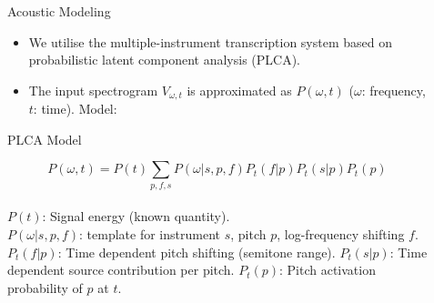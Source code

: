 \documentclass[final]{beamer}
\newlength{\sepwid}
\newlength{\onecolwid}
\newlength{\twocolwid}
\begin{document}
\begin{frame}[t]
\begin{columns}[t]
\begin{column}{\onecolwid}

\end{column} %

\begin{column}{\sepwid}\end{column} %

\begin{column}{\twocolwid} %

\begin{columns}[t,totalwidth=\twocolwid] %

\begin{column}{\onecolwid}\vspace{-.6in} %


\begin{block}{Acoustic Modeling}

\begin{itemize}
\item We utilise the multiple-instrument transcription system based on probabilistic latent component analysis (PLCA). 
\item The input spectrogram $V_{\omega,t}$ is approximated as $P(\omega,t)$ ($\omega$: frequency, $t$: time). Model:
\end{itemize}

\begin{alertblock}{PLCA Model}

\begin{equation}
P(\omega,t) = P(t)\sum_{p,f,s}P(\omega|s,p,f)P_{t}(f|p)P_{t}(s|p)P_{t}(p) \label{eq:Model}
\end{equation} 
\\
$P(t)$: Signal energy (known quantity). \\
$P(\omega|s,p,f)$: template for instrument $s$, pitch $p$, log-frequency shifting $f$. \\
$P_{t}(f|p)$: Time dependent pitch shifting (semitone range). 
$P_{t}(s|p)$: Time dependent source contribution per pitch.
$P_{t}(p)$: Pitch activation probability of $p$ at $t$. 
\end{alertblock}


\end{block}
\end{column}
\end{columns}
\end{column}
\end{columns}
\end{frame}
\end{document}
